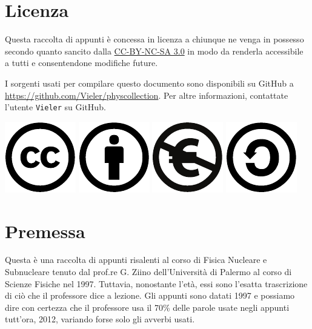 \chapter{Licenza}
Questa raccolta di appunti è concessa in licenza a chiunque ne venga in possesso
secondo quanto sancito dalla \href{http://creativecommons.org/licenses/by-nc-sa/3.0/it/}{CC-BY-NC-SA 3.0}
in modo da renderla accessibile a tutti e consentendone modifiche future.

I sorgenti usati per compilare questo documento sono disponibili su GitHub a
\url{https://github.com/Vieler/physcollection}. Per altre informazioni,
contattate l'utente \verb!Vieler! su GitHub.
\begin{flushright}
\includegraphics[scale=1]{img/cc}
\includegraphics[scale=1]{img/by}
\includegraphics[scale=1]{img/nc-eu}
\includegraphics[scale=1]{img/sa}
\end{flushright}
\chapter{Premessa}
\vfill
Questa è una raccolta di appunti risalenti al corso di Fisica Nucleare e
Subnucleare tenuto dal prof.re G. Ziino dell'Università di Palermo al corso di
Scienze Fisiche nel 1997. Tuttavia, nonostante l'età, essi sono l'esatta
trascrizione di ciò che il professore dice a lezione. Gli appunti sono datati
1997 e possiamo dire con certezza che il professore usa il 70\% delle parole
usate negli appunti tutt'ora, 2012, variando forse solo gli avverbi usati.

